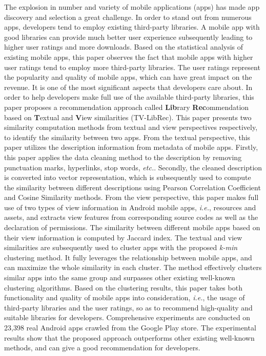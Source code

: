 The explosion in number and variety of mobile applications (apps) has made app discovery and selection a great challenge. In order to stand out from numerous apps, developers tend to employ existing third-party libraries. A mobile app with good libraries can provide much better user experience subsequently leading to higher user ratings and more downloads. Based on the statistical analysis of existing mobile apps, this paper observes the fact that mobile apps with higher user ratings tend to employ more third-party libraries. The user ratings represent the popularity and quality of mobile apps, which can have great impact on the revenue. It is one of the most significant aspects that developers care about. In order to help developers make full use of the available third-party libraries, this paper proposes a recommendation approach called \textbf{Lib}rary \textbf{Rec}ommendation based on \textbf{T}extual and \textbf{V}iew similarities (TV-LibRec). This paper presents two similarity computation methods from textual and view perspectives respectively, to identify the similarity between two apps. From the textual perspective, this paper utilizes the description information from metadata of mobile apps. Firstly, this paper applies the data cleaning method to the description by removing punctuation marks, hyperlinks, stop words, \textit{etc.}. Secondly, the cleaned description is converted into vector representation, which is subsequently used to compute the similarity between different descriptions using Pearson Correlation Coefficient and Cosine Similarity methods. From the view perspective, this paper makes full use of two types of view information in Android mobile apps, \textit{i.e.}, resources and assets, and extracts view features from corresponding source codes as well as the declaration of permissions. The similarity between different mobile apps based on their view information is computed by Jaccard index. The textual and view similarities are subsequently used to cluster apps with the proposed \textit{k-min} clustering method. It fully leverages the relationship between mobile apps, and can maximize the whole similarity in each cluster. The method effectively clusters similar apps into the same group and surpasses other existing well-known clustering algorithms. Based on the clustering results, this paper takes both functionality and quality of mobile apps into consideration, \textit{i.e.}, the usage of third-party libraries and the user ratings, so as to recommend high-quality and suitable libraries for developers. Comprehensive experiments are conducted on 23,398 real Android apps crawled from the Google Play store. The experimental results show that the proposed approach outperforms other existing well-known methods, and can give a good recommendation for developers.